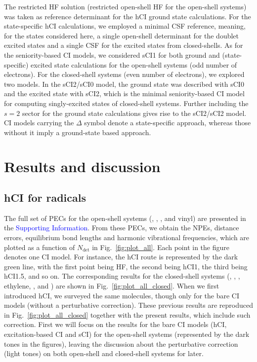 \documentclass[aip,jcp,reprint,noshowkeys,superscriptaddress]{revtex4-1}
\newcommand{\SupInf}{\textcolor{blue}{Supporting Information}}
\newcommand{\Ndet}{N_\text{det}}
\begin{document}
The restricted HF solution (restricted open-shell HF for the open-shell systems) was taken as reference determinant for the hCI ground state calculations.
For the state-specific hCI calculations, we employed a minimal CSF reference, \cite{Kossoski_2023}
meaning, for the states considered here, a single open-shell determinant for the doublet excited states and a single CSF for the excited states from closed-shells.
As for the seniority-based CI models, 
we considered sCI1 for both ground and (state-specific) excited state calculations for the open-shell systems (odd number of electrons).
For the closed-shell systems (even number of electrons), we explored two models.
In the sCI2/sCI0 model, the ground state was described with sCI0 and the excited state with sCI2, which is the minimal seniority-based CI model for computing singly-excited states of closed-shell systems.
Further including the $s=2$ sector for the ground state calculations gives rise to the sCI2/sCI2 model.
CI models carrying the $\Delta$ symbol denote a state-specific approach, whereas those without it imply a ground-state based approach.


\section{Results and discussion}
\label{sec:res}


\subsection{hCI for radicals}
\label{sec:res_A}


The full set of PECs for the open-shell systems (, , , and vinyl) are presented in the {\SupInf}.
From these PECs, we obtain the NPEs, distance errors, equilibrium bond lengths and harmonic vibrational frequencies, which are plotted as a function of $\Ndet$ in Fig.~\ref{fig:plot_all}.
Each point in the figure denotes one CI model.
For instance, the hCI route is represented by the dark green line, with the first point being HF, the second being hCI1, the third being hCI1.5, and so on.
The corresponding results for the closed-shell systems (, , , ethylene, , and ) are shown in Fig.~\ref{fig:plot_all_closed}.
When we first introduced hCI, \cite{Kossoski_2022} we surveyed the same molecules, though only for the bare CI models (without a perturbative correction).
These previous results are reproduced in Fig.~\ref{fig:plot_all_closed} together with the present results, which include such correction.
First we will focus on the results for the bare CI models (hCI, excitation-based CI and sCI) for the open-shell systems (represented by the dark tones in the figures),
leaving the discussion about the perturbative correction (light tones) on both open-shell and closed-shell systems for later.
\end{document}
